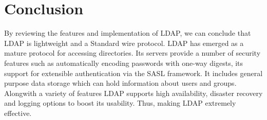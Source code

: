 \documentclass[9pt,twocolumn,twoside]{styles/osajnl}
\begin{document}
\section{Conclusion}
By reviewing the features and implementation of LDAP, we can conclude
that LDAP is lightweight and a Standard wire protocol. LDAP has
emerged as a mature protocol for accessing directories. Its servers
provide a number of security features such as automatically encoding
passwords with one-way digests, its support for extensible
authentication via the SASL framework. It includes general purpose
data storage which can hold information about users and
groups. Alongwith a variety of features LDAP supports high
availability, disaster recovery and logging options to boost its
usability. Thus, making LDAP extremely effective.





 
\end{document}
